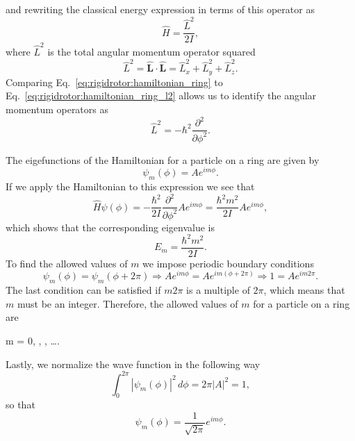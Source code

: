 \documentclass[../Main/chem331-notes.tex]{subfiles}
\begin{document}
and rewriting the classical energy expression in terms of this operator as
\begin{equation}
\label{eq:rigidrotor:hamiltonian_ring_l2}
\hat{H} =\frac{\hat{L}^2}{2 I},
\end{equation}
where $\hat{L}^2$ is the total angular momentum operator squared
\begin{equation}
\hat{L}^2 = \hat{\mathbf{L}} \cdot \hat{\mathbf{L}} = \hat{L}_x^2 + \hat{L}_y^2 + \hat{L}_z^2.
\end{equation}
Comparing Eq.~\eqref{eq:rigidrotor:hamiltonian_ring} to Eq.~\eqref{eq:rigidrotor:hamiltonian_ring_l2} allows us to identify the angular momentum operators as
\begin{equation}
\hat{L}^2 = -\hbar^2 \frac{\partial^2}{\partial \phi^2}.
\end{equation}

The eigefunctions of the Hamiltonian for a particle on a ring are given by
\begin{equation}
\psi_m(\phi) = A e^{i m \phi}.
\end{equation}
If we apply the Hamiltonian to this expression we see that
\begin{equation}
\hat{H} \psi(\phi) = -\frac{\hbar^2}{2 I} \frac{\partial^2}{\partial \phi^2} A e^{i m \phi}
=\frac{\hbar^2 m^2}{2 I}  A e^{i m \phi},
\end{equation}
which shows that the corresponding eigenvalue is 
\begin{equation}
E_m = \frac{\hbar^2 m^2}{2 I}.
\end{equation}
To find the allowed values of $m$ we impose periodic boundary conditions
\begin{equation}
\psi_m(\phi) = \psi_m(\phi + 2\pi) \Rightarrow  A e^{i m \phi} =  A e^{i m (\phi + 2\pi)}  \Rightarrow  1 =  A e^{i m 2\pi}.
\end{equation}
The last condition can be satisfied if $ m 2\pi$ is a multiple of $2\pi$, which means that $m$ must be an integer.
Therefore, the allowed values of $m$ for a particle on a ring are
\begin{iequation}
m = 0, , , \ldots .
\end{iequation}

Lastly, we normalize the wave function in the following way
\begin{equation}
\int_0^{2\pi} |\psi_m(\phi)|^2 \, d\phi = 2 \pi |A|^2 = 1,
\end{equation}
so that
\begin{equation}
\psi_m(\phi) = \frac{1}{\sqrt{2\pi}} e^{i m \phi}.
\end{equation}
\end{document}
